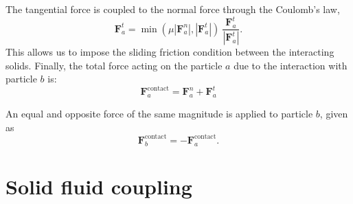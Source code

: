 \documentclass[preprint,12pt]{elsarticle}
\newcommand{\ten}[1]{\ensuremath{\mathbf{#1}}}
\begin{document}
The tangential force is coupled to the normal force through the Coulomb's law,
\begin{equation}
  \label{eq:Coulomb-law}
  \ten{F}_{a}^{t} = \min(\mu |\ten{F}_{a}^{n}|, |\ten{F}_{a}^{t}|) \
  \frac{\ten{F}_{a}^{t}}{|\ten{F}_{a}^{t}|}.
\end{equation}
This allows us to impose the sliding friction condition between the
interacting solids. Finally, the total force acting on the particle $a$ due to
the interaction with particle $b$ is:
\begin{equation}
  \label{eq:contact-force}
  \ten{F}_{a}^{\text{contact}} = \ten{F}_{a}^{n} + \ten{F}_{a}^{t}
\end{equation}

An equal and opposite force of the same magnitude is applied to
particle $b$, given as
\begin{equation}
  \label{eq:contact-force}
  \ten{F}_{b}^{\text{contact}} = - \ten{F}_{a}^{\text{contact}}.
\end{equation}



\FloatBarrier%
\section{Solid fluid coupling}
\label{sec:rfc}

\end{document}
